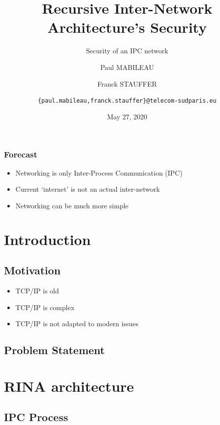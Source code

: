\documentclass[aspectratio=169]{beamer}
\author[MABILEAU, STAUFFER]{Paul MABILEAU
\and
Franck STAUFFER
\and 
\texttt{\{paul.mabileau,franck.stauffer\}@telecom-sudparis.eu}}
\institute[TSP]{TELECOM SudParis}
\title[RINA's security]{Recursive Inter-Network Architecture's Security}
\subtitle{Security of an IPC network}
\date[2020/05/27]{May 27, 2020}
\begin{document}
\maketitle

\begin{frame}
    \frametitle{Forecast}
    \begin{itemize}
        \item Networking is only Inter-Process Communication (IPC)
        \item Current `internet' is not an actual inter-network
        \item Networking can be much more simple
    \end{itemize}
\end{frame}


\section{Introduction}

\subsection{Motivation}
\begin{frame}
    \begin{itemize}
        \item TCP/IP is old
        \item TCP/IP is complex
        \item TCP/IP is not adapted to modern issues
    \end{itemize}
\end{frame}

\subsection{Problem Statement}

\section{RINA architecture}
\subsection{IPC Process}
\end{document}
